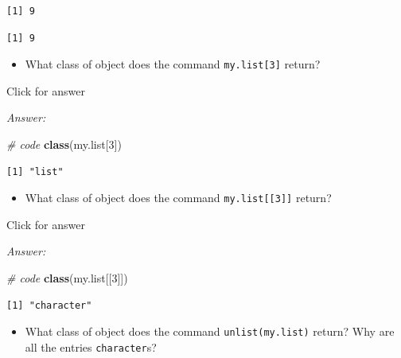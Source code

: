 \documentclass[
]{book}
\newenvironment{Shaded}{\begin{snugshade}}{\end{snugshade}}
\newcommand{\CommentTok}[1]{\textcolor[rgb]{0.56,0.35,0.01}{\textit{#1}}}
\newcommand{\DecValTok}[1]{\textcolor[rgb]{0.00,0.00,0.81}{#1}}
\newcommand{\FunctionTok}[1]{\textcolor[rgb]{0.13,0.29,0.53}{\textbf{#1}}}
\newcommand{\NormalTok}[1]{#1}
\newcommand{\SpecialCharTok}[1]{\textcolor[rgb]{0.81,0.36,0.00}{\textbf{#1}}}
\providecommand{\tightlist}{%
  \setlength{\itemsep}{0pt}\setlength{\parskip}{0pt}}
\begin{document}
\begin{verbatim}
[1] 9
\end{verbatim}

\begin{Shaded}
\end{Shaded}

\begin{verbatim}
[1] 9
\end{verbatim}

\begin{itemize}
\tightlist
\item
  What class of object does the command \texttt{my.list{[}3{]}} return?
\end{itemize}

Click for answer

\emph{Answer:}

\begin{Shaded}
\begin{Highlighting}[]
\CommentTok{\# code}
\FunctionTok{class}\NormalTok{(my.list[}\DecValTok{3}\NormalTok{])}
\end{Highlighting}
\end{Shaded}

\begin{verbatim}
[1] "list"
\end{verbatim}

\begin{itemize}
\tightlist
\item
  What class of object does the command \texttt{my.list{[}{[}3{]}{]}} return?
\end{itemize}

Click for answer

\emph{Answer:}

\begin{Shaded}
\begin{Highlighting}[]
\CommentTok{\# code}
\FunctionTok{class}\NormalTok{(my.list[[}\DecValTok{3}\NormalTok{]])}
\end{Highlighting}
\end{Shaded}

\begin{verbatim}
[1] "character"
\end{verbatim}

\begin{itemize}
\tightlist
\item
  What class of object does the command \texttt{unlist(my.list)} return? Why are all the entries \texttt{character}s?
\end{itemize}
\end{document}
